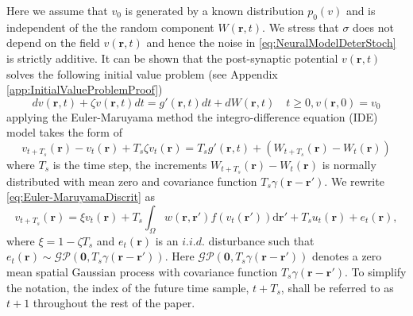 \documentclass[a4paper,10pt]{article}
\begin{document}
Here we assume that $v_0$ is generated by a known distribution $p_0(v)$ and is independent of the the random component $W(\mathbf r,t)$. We stress that $\sigma$ does not depend on the field $v(\mathbf r, t)$
and hence the noise in \eqref{eq:NeuralModelDeterStoch} is strictly additive. It can be shown that the post-synaptic potential $v(\mathbf r, t)$ solves the following initial value problem (see Appendix \ref{app:InitialValueProblemProof})
\begin{equation}
 dv(\mathbf r, t) + \zeta v(\mathbf r, t)dt = g'(\mathbf r, t)dt + dW(\mathbf r, t) \quad t\ge0, v(\mathbf r, 0) = v_0
\end{equation}
applying the Euler-Maruyama method the integro-difference equation (IDE) model takes the form of
\begin{equation}\label{eq:Euler-MaruyamaDiscrit}
 v_{t+T_s}(\mathbf r)- v_{t}(\mathbf r)+ T_s\zeta v_t(\mathbf r)= T_sg'(\mathbf r, t) + (W_{t+T_s}(\mathbf r)-W_t(\mathbf r))
\end{equation}
where $T_s$ is the time step, the increments $W_{t+T_s}(\mathbf r)-W_t(\mathbf r)$ is normally distributed with mean zero and covariance function $T_s\gamma(\mathbf r-\mathbf r')$. We rewrite \eqref{eq:Euler-MaruyamaDiscrit} as
\begin{equation}
	\label{DiscreteTimeModel} 
	v_{t+T_s}\left(\mathbf{r}\right) = 
	\xi v_t\left(\mathbf{r}\right) + 
	T_s \int_\Omega { 
	    w\left(\mathbf{r},\mathbf{r}'\right)
	    f\left(v_t\left(\mathbf{r}'\right)\right) 
	\textrm{d}\mathbf{r}'}+T_su_t(\mathbf r)
	+ e_t\left(\mathbf{r}\right), 
\end{equation}
 where $\xi = 1-\zeta T_s$ and $e_t(\mathbf{r})$ is an $i.i.d.$ disturbance such that $e_t(\mathbf{r})\sim\mathcal{GP}(\mathbf 0,T_s\gamma(\mathbf{r}-\mathbf{r}'))$. Here $\mathcal{GP}(\mathbf 0,T_s\gamma(\mathbf{r}-\mathbf{r}'))$ denotes a zero mean spatial Gaussian process with covariance function $T_s\gamma(\mathbf{r}-\mathbf{r}')$. To simplify the notation, the index of the future time sample, $t+T_s$, shall be referred to as $t+1$ throughout the rest of the paper. 
\end{document}
